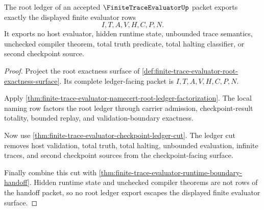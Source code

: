 \begin{theorem}
\label{thm:finitetrace-evaluator-ledger-nonescape}
The root ledger of an accepted $\FiniteTraceEvaluatorUp$ packet exports exactly
the displayed finite evaluator rows
$$
I,T,A,V,H,C,P,N.
$$
It exports no host evaluator, hidden runtime state, unbounded trace semantics,
unchecked compiler theorem, total truth predicate, total halting classifier, or
second checkpoint source.
\end{theorem}
\begin{proof}
Project the root exactness surface of
\autoref{def:finite-trace-evaluator-root-exactness-surface}. Its complete
ledger-facing packet is $I,T,A,V,H,C,P,N$.

Apply \autoref{thm:finite-trace-evaluator-namecert-root-ledger-factorization}.
The local naming row factors the root ledger through carrier admission,
checkpoint-result totality, bounded replay, and validation-boundary exactness.

Now use \autoref{thm:finite-trace-evaluator-checkpoint-ledger-cut}. The ledger
cut removes host validation, total truth, total halting, unbounded evaluation,
infinite traces, and second checkpoint sources from the checkpoint-facing
surface.

Finally combine this cut with
\autoref{thm:finite-trace-evaluator-runtime-boundary-handoff}. Hidden runtime
state and unchecked compiler theorems are not rows of the handoff packet, so no
root ledger export escapes the displayed finite evaluator surface.
\end{proof}

